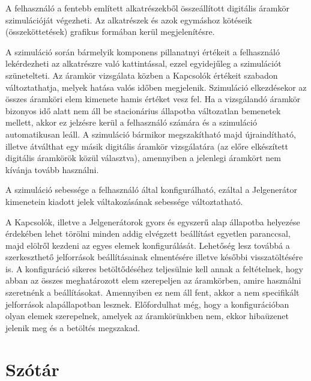 A felhasználó a fentebb említett alkatrészekből összeállított digitális áramkör szimulációját végezheti. Az alkatrészek és azok egymáshoz kötéseik (összeköttetések) grafikus formában kerül megjelenítésre.

A szimuláció során bármelyik komponens pillanatnyi értékeit a felhasználó lekérdezheti az alkatrészre való kattintással, ezzel egyidejűleg a szimulációt szünetelteti. Az áramkör vizsgálata közben a Kapcsolók értékeit szabadon változtathatja, melyek hatása valós időben megjelenik. Szimuláció elkezdésekor az összes áramköri elem kimenete hamis értéket vesz fel. Ha a vizsgálandó áramkör bizonyos idő alatt nem áll be stacionárius állapotba változatlan bemenetek mellett, akkor ez jelzésre kerül a felhasználó számára és a szimuláció automatikusan leáll. A szimuláció bármikor megszakítható majd újraindítható, illetve átválthat egy másik digitális áramkör vizsgálatára (az előre elkészített digitális áramkörök közül választva), amennyiben a jelenlegi áramkört nem kívánja tovább használni.

A szimuláció sebessége a felhasználó által konfigurálható, ezáltal a Jelgenerátor kimenetein kiadott jelek váltakozásának sebessége változtatható.

A Kapcsolók, illetve a Jelgenerátorok gyors és egyszerű alap állapotba helyezése érdekében lehet törölni minden addig elvégzett beállítást egyetlen paranccsal, majd elölről kezdeni az egyes elemek konfigurálását. Lehetőség lesz továbbá a szerkeszthető jelforrások beállításainak elmentésére illetve későbbi visszatöltésére is. A konfiguráció sikeres betöltődéséhez teljesülnie kell annak a feltételnek, hogy abban az összes meghatározott elem szerepeljen az áramkörben, amire használni szeretnénk a beállításokat. Amennyiben ez nem áll fent, akkor a nem specifikált jelforrások alapállapotban lesznek. Előfordulhat még, hogy a konfigurációban olyan elemek szerepelnek, amelyek az áramkörünkben nem, ekkor hibaüzenet jelenik meg és a betöltés megszakad.

\section{Szótár}
\label{sec:dictionary}

